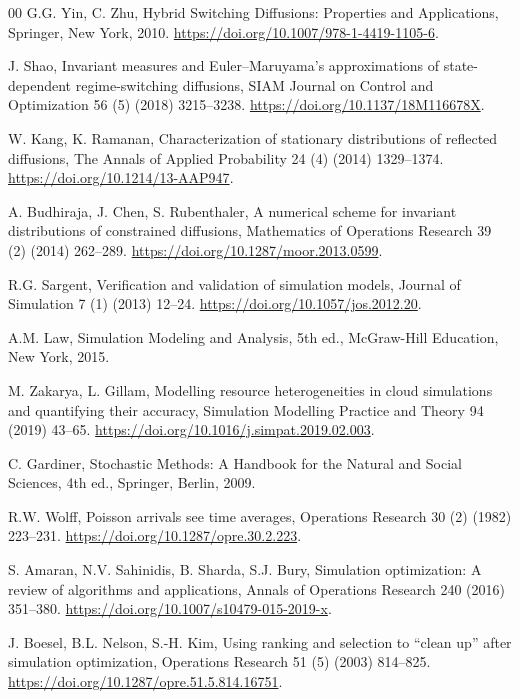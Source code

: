 \documentclass[preprint,12pt]{elsarticle}
\begin{document}
\begin{thebibliography}{00}
G.G. Yin, C. Zhu,
Hybrid Switching Diffusions: Properties and Applications,
Springer, New York, 2010.
\newblock \url{https://doi.org/10.1007/978-1-4419-1105-6}.

J. Shao,
Invariant measures and Euler--Maruyama's approximations of state-dependent regime-switching diffusions,
SIAM Journal on Control and Optimization 56 (5) (2018) 3215--3238.
\newblock \url{https://doi.org/10.1137/18M116678X}.

W. Kang, K. Ramanan,
Characterization of stationary distributions of reflected diffusions,
The Annals of Applied Probability 24 (4) (2014) 1329--1374.
\newblock \url{https://doi.org/10.1214/13-AAP947}.

A. Budhiraja, J. Chen, S. Rubenthaler,
A numerical scheme for invariant distributions of constrained diffusions,
Mathematics of Operations Research 39 (2) (2014) 262--289.
\newblock \url{https://doi.org/10.1287/moor.2013.0599}.

R.G. Sargent,
Verification and validation of simulation models,
Journal of Simulation 7 (1) (2013) 12--24.
\newblock \url{https://doi.org/10.1057/jos.2012.20}.

A.M. Law,
Simulation Modeling and Analysis, 5th ed.,
McGraw-Hill Education, New York, 2015.

M. Zakarya, L. Gillam,
Modelling resource heterogeneities in cloud simulations and quantifying their accuracy,
Simulation Modelling Practice and Theory 94 (2019) 43--65.
\newblock \url{https://doi.org/10.1016/j.simpat.2019.02.003}.

C. Gardiner,
Stochastic Methods: A Handbook for the Natural and Social Sciences, 4th ed.,
Springer, Berlin, 2009.

R.W. Wolff,
Poisson arrivals see time averages,
Operations Research 30 (2) (1982) 223--231.
\newblock \url{https://doi.org/10.1287/opre.30.2.223}.


S. Amaran, N.V. Sahinidis, B. Sharda, S.J. Bury,
Simulation optimization: A review of algorithms and applications,
Annals of Operations Research 240 (2016) 351--380.
\newblock \url{https://doi.org/10.1007/s10479-015-2019-x}.

J. Boesel, B.L. Nelson, S.-H. Kim,
Using ranking and selection to ``clean up'' after simulation optimization,
Operations Research 51 (5) (2003) 814--825.
\newblock \url{https://doi.org/10.1287/opre.51.5.814.16751}.


\end{thebibliography}
\end{document}

